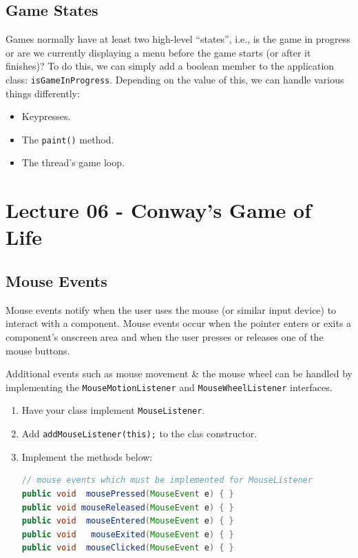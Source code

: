 \documentclass[11pt]{article}
\begin{document}
\subsection{Game States} 
Games normally have at least two high-level ``states'', i.e., is the game in progress or are we currently displaying 
a menu before the game starts (or after it finishes)? 
To do this, we can simply add a boolean member to the application class: \verb|isGameInProgress|. 
Depending on the value of this, we can handle various things differently:
\begin{itemize}
    \item   Keypresses. 
    \item   The \verb|paint()| method. 
    \item   The thread's game loop. 
\end{itemize} 

\section{Lecture 06 - Conway's Game of Life}
\subsection{Mouse Events}
Mouse events notify when the user uses the mouse (or similar input device) to interact with a component.
Mouse events occur when the pointer enters or exits a component's onscreen area and when the user presses or releases one of the mouse buttons. 

Additional events such as mouse movement \& the mouse wheel can be handled by implementing the \verb|MouseMotionListener| 
and \verb|MouseWheelListener| interfaces.
\begin{enumerate}
    \item   Have your class implement \verb|MouseListener|. 
    \item   Add \verb|addMouseListener(this);| to the clas constructor. 
    \item   Implement the methods below: 
        \begin{lstlisting}[language=Java]
// mouse events which must be implemented for MouseListener 
public void  mousePressed(MouseEvent e) { }
public void mouseReleased(MouseEvent e) { }
public void  mouseEntered(MouseEvent e) { }
public void   mouseExited(MouseEvent e) { }
public void  mouseClicked(MouseEvent e) { }
\end{lstlisting}
\end{enumerate}
\end{document}
